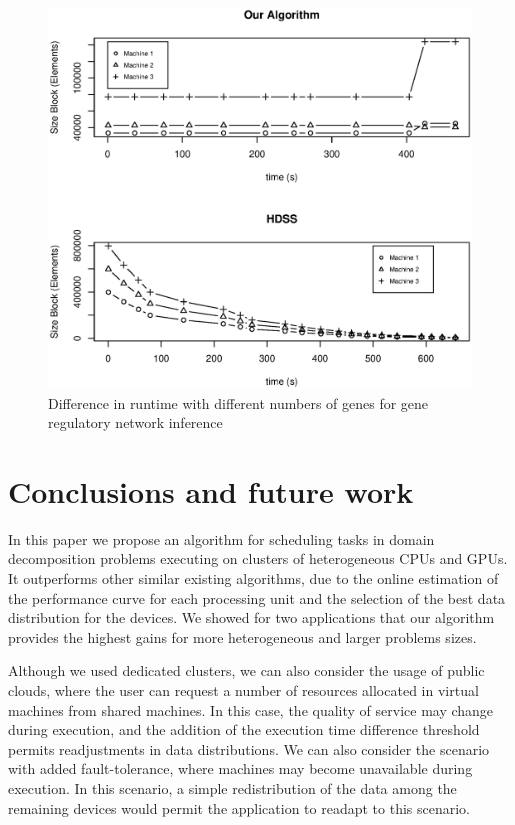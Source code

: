 \documentclass[journal]{IEEEtran}
\begin{document}
\begin{figure}[htb]
	\begin{center}
	\centering
			\includegraphics[scale=0.4]{BlocosComportamento_Fabrizio.eps}
	\caption{Difference in runtime with different numbers of genes for gene regulatory network inference}
	\label{fig:GeneBlocos}
	\end{center}
\end{figure}
\section{Conclusions and future work}

In this paper we propose an algorithm for scheduling tasks in domain
decomposition problems executing on clusters of heterogeneous CPUs and GPUs. It
outperforms other similar existing algorithms, due to the online estimation of
the performance curve for each processing unit and the selection of the best
data distribution for the devices. We showed for two applications that our
algorithm provides the highest gains for more heterogeneous and larger problems
sizes.

Although we used dedicated clusters, we can also consider the usage of public
clouds, where the user can request a number of resources allocated in virtual
machines from shared machines. In this case, the quality of service may change
during execution, and the addition of the execution time difference threshold
permits readjustments in data distributions. We can also consider the scenario
with added fault-tolerance, where machines may become unavailable during
execution. In this scenario, a simple redistribution of the data among the
remaining devices would permit the application to readapt to this scenario.
\end{document}

